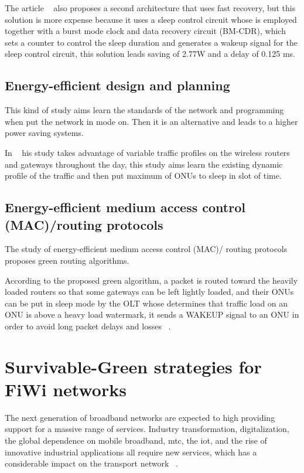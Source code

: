 \documentclass[conference,compsoc]{IEEEtran}
\begin{document}
The article ~\cite{sleepmode} also proposes a second architecture that uses fast recovery, but this 
solution is more expense because it uses a sleep control circuit whose is
employed together with a burst mode clock and data recovery circuit (BM-CDR), which sets a counter 
to control the sleep duration and generates a wakeup signal for the sleep control circuit, this 
solution leads saving of 2.77W and a delay of 0.125 ms.


\subsection{Energy-efficient design and planning}
 
 This kind of study aims learn the standards of the network and programming when put the network in 
 mode on. Then it is an alternative and leads to a higher power saving systems.
 
 In ~\cite{5424000} his study takes advantage of variable traffic profiles on the wireless 
routers and gateways throughout the day, this study aims learn the existing dynamic profile of the 
 traffic and then put maximum of ONUs to sleep in slot of time.
 
 
\subsection{Energy-efficient medium access control (MAC)/routing protocols }

 The study of energy-efficient medium access control (MAC)/ routing protocols proposes green 
routing algorithms.

According to the proposed green algorithm, a packet is
routed toward the heavily loaded routers so that some gateways
can be left lightly loaded, and their ONUs can be put in sleep
mode by the OLT whose determines that traffic load on
an ONU is above a heavy load watermark, it sends a WAKEUP
signal to an ONU in order to avoid long packet delays and losses ~\cite{fiwienergyeficient}.





  
\section{Survivable-Green strategies for FiWi networks}%

The next generation of broadband networks are expected to  high providing support for a massive 
range of services. Industry transformation, digitalization, the global dependence on mobile 
broadband, mtc, the iot, and the rise of innovative industrial applications all require new 
services, which has a considerable impact on the transport network ~\cite{5greview}.
\end{document}
